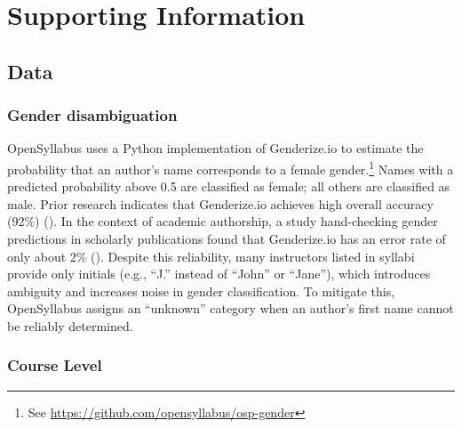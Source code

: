 \documentclass[
  11pt,
]{article}
\begin{document}
\newpage
\appendix
\renewcommand{\thefigure}{SI-\arabic{figure}}
\renewcommand{\thesection}{SI}
\renewcommand{\thesubsection}{SI-\arabic{subsection}}

\setcounter{figure}{0}
\setcounter{table}{0}
\setcounter{section}{0}
\setcounter{subsection}{0}
\renewcommand{\thetable}{SI-\arabic{table}}

\section{Supporting Information}\label{supporting-information}

\subsection{Data}\label{data}

\subsubsection{Gender disambiguation}\label{gender-disambiguation}

OpenSyllabus uses a Python implementation of Genderize.io to estimate the probability that an author's name corresponds to a female gender.\footnote{See \url{https://github.com/opensyllabus/osp-gender}} Names with a predicted probability above 0.5 are classified as female; all others are classified as male. Prior research indicates that Genderize.io achieves high overall accuracy (92\%) (). In the context of academic authorship, a study hand-checking gender predictions in scholarly publications found that Genderize.io has an error rate of only about 2\% (). Despite this reliability, many instructors listed in syllabi provide only initials (e.g., ``J.'' instead of ``John'' or ``Jane''), which introduces ambiguity and increases noise in gender classification. To mitigate this, OpenSyllabus assigns an ``unknown'' category when an author's first name cannot be reliably determined.

\subsubsection{Course Level}\label{course-level}
\end{document}
